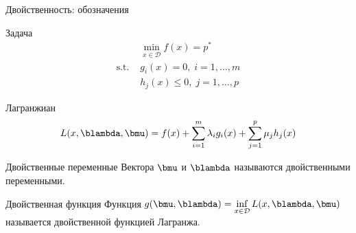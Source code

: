 \documentclass[12pt]{beamer}
\begin{document}
\begin{frame}{Двойственность: обозначения}
\small
\begin{block}{Задача}
\vspace{-5mm}
\begin{equation*}
\begin{split}
& \min\limits_{x \in \mathcal{D}} f(x) = p^*\\
\text{s.t. } & g_i(x) = 0, \; i = 1,\ldots,m\\
& h_j(x) \leq 0, \; j = 1,\ldots, p
\end{split}
\end{equation*}
\end{block}

\begin{block}{Лагранжиан}
\vspace{-2mm}
\begin{equation*}
L(x, \blambda, \bmu) = f(x) + \sum\limits_{i=1}^m\lambda_i g_i(x) + \sum\limits_{j=1}^p \mu_j h_j(x)
\vspace{-2mm}
\end{equation*}
\end{block}

\begin{block}{Двойственные переменные}
Вектора $\bmu$ и $\blambda$ называются двойственными переменными.
\end{block}

\begin{block}{Двойственная функция}
Функция $g(\bmu, \blambda) = \inf\limits_{x\in \mathcal{D}} L(x, \blambda, \bmu)$ называется двойственной функцией Лагранжа.
\end{block}

\end{frame}
\end{document}
